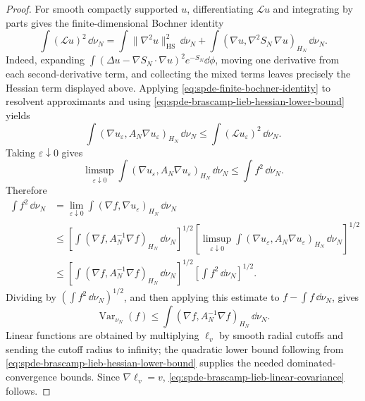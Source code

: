 \begin{proof}
For smooth compactly supported \(u\), differentiating \(\mathcal L u\) and
integrating by parts gives the finite-dimensional Bochner identity
\begin{equation}
  \int(\mathcal L u)^2\,\dd\nu_N
  =
  \int\|\nabla^2u\|_{\mathrm{HS}}^2\,\dd\nu_N
  +
  \int(\nabla u,\nabla^2S_N\,\nabla u)_{H_N}\,\dd\nu_N .
  \label{eq:spde-finite-bochner-identity}
\end{equation}
Indeed, expanding
\(\int(\Delta u-\nabla S_N\cdot\nabla u)^2e^{-S_N}\dd\phi\), moving one
derivative from each second-derivative term, and collecting the mixed terms
leaves precisely the Hessian term displayed above.  Applying
\eqref{eq:spde-finite-bochner-identity} to resolvent approximants and using
\eqref{eq:spde-brascamp-lieb-hessian-lower-bound} yields
\begin{equation}
  \int(\nabla u_\varepsilon,A_N\nabla u_\varepsilon)_{H_N}\,\dd\nu_N
  \leq
  \int(\mathcal L u_\varepsilon)^2\,\dd\nu_N .
  \label{eq:spde-bl-gradient-resolvent-bound}
\end{equation}
Taking \(\varepsilon\downarrow0\) gives
\begin{equation}
  \limsup_{\varepsilon\downarrow0}
  \int(\nabla u_\varepsilon,A_N\nabla u_\varepsilon)_{H_N}\,\dd\nu_N
  \leq
  \int f^2\,\dd\nu_N .
  \label{eq:spde-bl-gradient-limsup}
\end{equation}
Therefore
\[
\begin{aligned}
  \int f^2\,\dd\nu_N
  &=
  \lim_{\varepsilon\downarrow0}
  \int(\nabla f,\nabla u_\varepsilon)_{H_N}\,\dd\nu_N
\\
  &\leq
  \left[
    \int(\nabla f,A_N^{-1}\nabla f)_{H_N}\,\dd\nu_N
  \right]^{1/2}
  \left[
    \limsup_{\varepsilon\downarrow0}
    \int(\nabla u_\varepsilon,A_N\nabla u_\varepsilon)_{H_N}\,\dd\nu_N
  \right]^{1/2}
\\
  &\leq
  \left[
    \int(\nabla f,A_N^{-1}\nabla f)_{H_N}\,\dd\nu_N
  \right]^{1/2}
  \left[
    \int f^2\,\dd\nu_N
  \right]^{1/2}.
\end{aligned}
\]
Dividing by \((\int f^2\,\dd\nu_N)^{1/2}\), and then applying this estimate
to \(f-\int f\,\dd\nu_N\), gives
\begin{equation}
  \operatorname{Var}_{\nu_N}(f)
  \leq
  \int(\nabla f,A_N^{-1}\nabla f)_{H_N}\,\dd\nu_N .
  \label{eq:spde-brascamp-lieb-general-bound}
\end{equation}
Linear functions are obtained by multiplying \(\ell_v\) by smooth radial
cutoffs and sending the cutoff radius to infinity; the quadratic lower bound
following from \eqref{eq:spde-brascamp-lieb-hessian-lower-bound} supplies the
needed dominated-convergence bounds.  Since
\(\nabla\ell_v=v\), \eqref{eq:spde-brascamp-lieb-linear-covariance} follows.


\end{proof}
